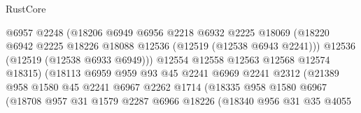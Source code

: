 \begin{lexlean}{RustCore}
\begin{coremodule}
                                    @6957
                                    @2248
                                    (@18206
                                      @6949
                                      @6956
                                      @2218
                                      @6932
                                      @2225
                                      @18069
                                      (@18220
                                        @6942
                                        @2225
                                        @18226
                                        @18088
                                        @12536
                                        (@12519 (@12538 @6943 @2241)))
                                      @12536
                                      (@12519 (@12538 @6933 @6949)))
                                    @12554
                                    @12558
                                    @12563
                                    @12568
                                    @12574
                                    @18315)
                                  (@18113
                                    @6959
                                    @959
                                    @93
                                    @45
                                    @2241
                                    @6969
                                    @2241
                                    @2312
                                    (@21389
                                      @958
                                      @1580
                                      @45
                                      @2241
                                      @6967
                                      @2262
                                      @1714
                                      (@18335
                                        @958
                                        @1580
                                        @6967
                                        (@18708
                                          @957
                                          @31
                                          @1579
                                          @2287
                                          @6966
                                          @18226
                                          (@18340
                                            @956
                                            @31
                                            @35
                                            @4055

\end{coremodule}
\end{lexlean}
